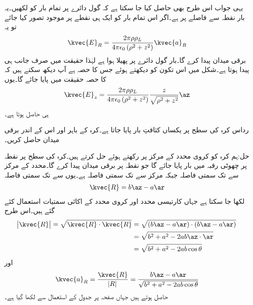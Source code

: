 یہی جواب اس طرح بھی حاصل کیا جا سکتا ہے کہ گول دائرے پر تمام بار کو  لکھیں۔یہ بار نقطہ  سے  فاصلے پر ہے۔اگر اس تمام بار کو ایک ہی نقطے   پر موجود تصور کیا جائے تو یہ
\begin{align*}
\kvec{E}_R=\frac{2\pi\rho\rho_L}{4\pi\epsilon_0 \left(\rho^2+z^2 \right)} \kvec{a}_R
\end{align*}
برقی میدان پیدا کرے گا۔بار گول دائرے پر پھیلا ہوا ہے لہٰذا حقیقت میں صرف  جانب ہی  پیدا ہوتا ہے۔شکل میں اس تکون کو دیکھتے ہوئے جس کا  حصہ ہے  آپ دیکھ سکتے ہیں کہ  کا  حصہ  حقیقت میں پایا جائے گا۔یوں 
\begin{align*}
\kvec{E}_z=\frac{2\pi\rho\rho_L}{4\pi\epsilon_0 \left(\rho^2+z^2 \right)} \frac{z}{\sqrt{\rho^2+z^2}} \az
\end{align*}
ہی حاصل ہوتا ہے۔

رداس  کرہ کی سطح پر یکساں کثافتِ بار  پایا جاتا ہے۔کرہ کے باہر اور اس کے اندر برقی میدان   حاصل کریں۔

حل:ہم کرہ کو کروی محدد کے مرکز پر رکھتے ہوئے حل کرتے ہیں۔کرہ کی سطح پر نقطہ  پر چھوٹی رقبہ  میں بار  پایا جائے گا جو  نقطہ  پر برقی میدان  پیدا کرے گا۔محدد کے مرکز سے  تک سمتی فاصلہ  جبکہ مرکز سے  تک سمتی فاصلہ  ہے۔یوں  سے  تک سمتی فاصلہ 
\begin{align}
\kvec{R}=b\az-a\ar
\end{align}
لکھا جا سکتا ہے جہاں کارتیسی محدد اور کروی محدد کے اکائی سمتیات استعمال کئے گئے ہیں۔اس طرح
\begin{gather}
\begin{aligned}
\abs{\kvec{R}}=\sqrt{\kvec{R} \cdot \kvec{R}}&= \sqrt{(b\az-a\ar)\cdot (b\az-a\ar)}\\
&=\sqrt{b^2+a^2-2 ab \az \cdot \ar}\\
&=\sqrt{b^2+a^2-2 ab \cos \theta}
\end{aligned}
\end{gather}
اور
\begin{align}
\kvec{a}_R=\frac{\kvec{R}}{\abs{R}}=\frac{b\az-a\ar}{\sqrt{b^2+a^2-2 ab \cos \theta}}
\end{align}
حاصل ہوتے ہیں جہاں صفحہ  پر جدول  کے استعمال سے  لکھا گیا ہے۔


